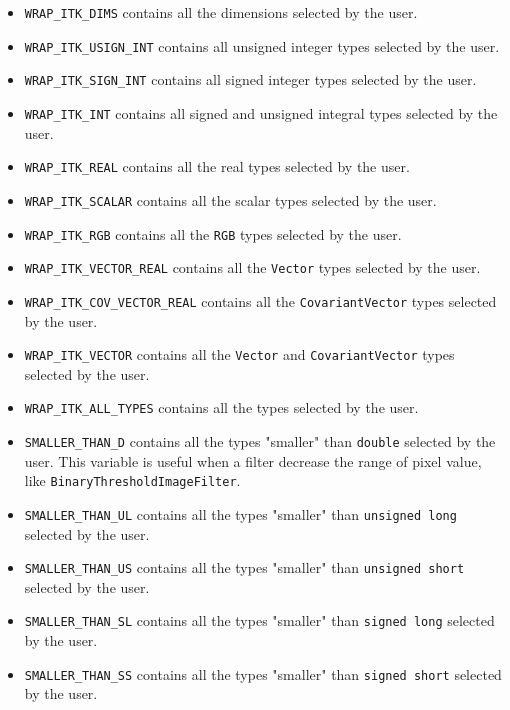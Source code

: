 \begin{itemize}
  \item \verb$WRAP_ITK_DIMS$ contains all the dimensions selected by the user.

  \item \verb$WRAP_ITK_USIGN_INT$ contains all unsigned integer types selected by the user.

  \item \verb$WRAP_ITK_SIGN_INT$ contains all signed integer types selected by the user.

  \item \verb$WRAP_ITK_INT$ contains all signed and unsigned integral types
selected by the user.

  \item \verb$WRAP_ITK_REAL$ contains all the real types selected by the user.

  \item \verb$WRAP_ITK_SCALAR$ contains all the scalar types selected by the user.

  \item \verb$WRAP_ITK_RGB$ contains all the \verb$RGB$ types selected by the user.

  \item \verb$WRAP_ITK_VECTOR_REAL$ contains all the \verb$Vector$ types selected
by the user.

  \item \verb$WRAP_ITK_COV_VECTOR_REAL$ contains all the \verb$CovariantVector$ types selected
by the user.

  \item \verb$WRAP_ITK_VECTOR$ contains all the \verb$Vector$ and 
\verb$CovariantVector$ types selected by the user.

  \item \verb$WRAP_ITK_ALL_TYPES$ contains all the types selected by the user.

  \item \verb$SMALLER_THAN_D$ contains all the types "smaller" than \verb$double$
selected by the user. This variable is useful when a filter decrease the range
of pixel value, like \verb$BinaryThresholdImageFilter$.

  \item \verb$SMALLER_THAN_UL$ contains all the types "smaller" than \verb$unsigned long$
selected by the user.

  \item \verb$SMALLER_THAN_US$ contains all the types "smaller" than \verb$unsigned short$
selected by the user.

  \item \verb$SMALLER_THAN_SL$ contains all the types "smaller" than \verb$signed long$
selected by the user.

  \item \verb$SMALLER_THAN_SS$ contains all the types "smaller" than \verb$signed short$
selected by the user.

\end{itemize}

